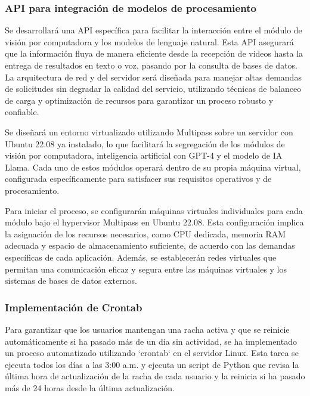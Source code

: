 \subsubsection{API para integración de modelos de procesamiento}

Se desarrollará una API específica para facilitar la interacción entre el módulo de visión por computadora y los modelos de lenguaje natural. Esta API asegurará que la información fluya de manera eficiente desde la recepción de videos hasta la entrega de resultados en texto o voz, pasando por la consulta de bases de datos. La arquitectura de red y del servidor será diseñada para manejar altas demandas de solicitudes sin degradar la calidad del servicio, utilizando técnicas de balanceo de carga y optimización de recursos para garantizar un proceso robusto y confiable.

Se diseñará un entorno virtualizado utilizando Multipass sobre un servidor con Ubuntu 22.08 ya instalado, lo que facilitará la segregación de los módulos de visión por computadora, inteligencia artificial con GPT-4 y el modelo de IA Llama. Cada uno de estos módulos operará dentro de su propia máquina virtual, configurada específicamente para satisfacer sus requisitos operativos y de procesamiento.

Para iniciar el proceso, se configurarán máquinas virtuales individuales para cada módulo bajo el hypervisor Multipass en Ubuntu 22.08. Esta configuración implica la asignación de los recursos necesarios, como CPU dedicada, memoria RAM adecuada y espacio de almacenamiento suficiente, de acuerdo con las demandas específicas de cada aplicación. Además, se establecerán redes virtuales que permitan una comunicación eficaz y segura entre las máquinas virtuales y los sistemas de bases de datos externos.

\subsubsection{Implementación de Crontab}

Para garantizar que los usuarios mantengan una racha activa y que se reinicie automáticamente si ha pasado más de un día sin actividad, se ha implementado un proceso automatizado utilizando `crontab` en el servidor Linux. Esta tarea se ejecuta todos los días a las 3:00 a.m. y ejecuta un script de Python que revisa la última hora de actualización de la racha de cada usuario y la reinicia si ha pasado más de 24 horas desde la última actualización.

